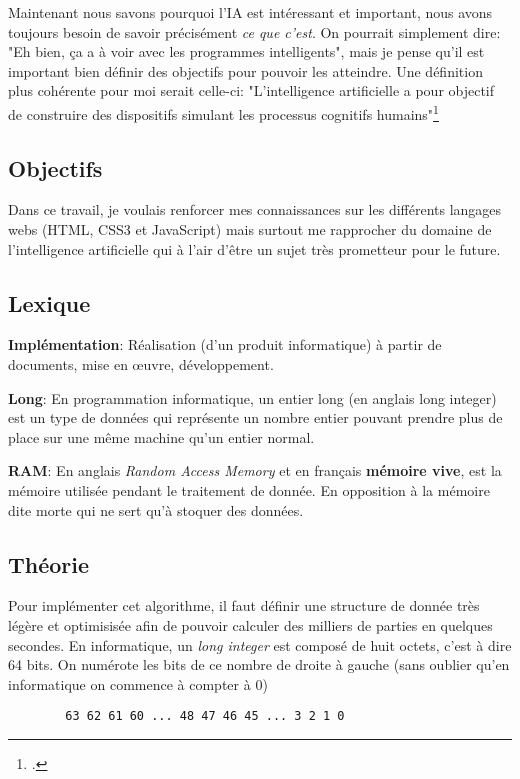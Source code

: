 \documentclass[a4paper]{article}
\newcommand{\lexique}[2]{\item{\textbf{#1}:} #2}
\begin{document}
    Maintenant nous savons pourquoi l'IA est intéressant et important, nous avons toujours besoin de savoir précisément \textit{ce que c'est}. On pourrait simplement dire: "Eh bien, ça a à voir avec les programmes intelligents", mais je pense qu'il est important bien définir des objectifs pour pouvoir les atteindre. Une définition plus cohérente pour moi serait celle-ci: "L’intelligence artificielle a pour objectif de construire des dispositifs simulant les processus cognitifs humains"\footcite{haiech_2020}
\subsection{Objectifs}
    Dans ce travail, je voulais renforcer mes connaissances sur les différents langages webs (HTML, CSS3 et JavaScript) mais surtout me rapprocher du domaine de l'intelligence artificielle qui à l'air d'être un sujet très prometteur pour le future.

\subsection{Lexique}
    \begin{description}
        \lexique{Implémentation}{Réalisation (d’un produit informatique) à partir de documents, mise en œuvre, développement.}
        \lexique{Long}{En programmation informatique, un entier long (en anglais long integer) est un type de données qui représente un nombre entier pouvant prendre plus de place sur une même machine qu'un entier normal.}
        \lexique{RAM}{En anglais \textit{Random Access Memory} et en français \textbf{mémoire vive}, est la mémoire utilisée pendant le traitement de donnée. En opposition à la mémoire dite morte qui ne sert qu'à stoquer des données.}
    \end{description}

\subsection{Théorie}
    Pour implémenter cet algorithme, il faut définir une structure de donnée très légère et optimisisée afin de pouvoir calculer des milliers de parties en quelques secondes. En informatique, un \textit{long integer} est composé de huit octets, c'est à dire 64 bits. On numérote les bits de ce nombre de droite à gauche (sans oublier qu'en informatique on commence à compter à 0)

    \begin{lstlisting}
        63 62 61 60 ... 48 47 46 45 ... 3 2 1 0
    \end{lstlisting}
    
\end{document}
